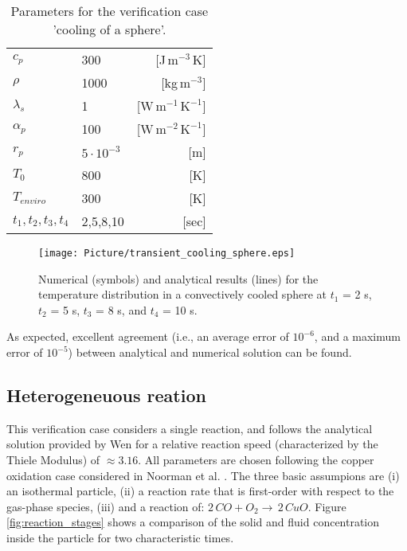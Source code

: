 \documentclass{particles2015}
\begin{document}
\begin{table}[h]
  \centering 
  \caption{Parameters for the verification case 'cooling of a sphere'.}
   \begin{tabular}{llr}
      \hline 
        $c_p$                   &300       & [J$\,\text{m}^{-3}\,$K]\\   
       	$\rho$					&1000	   & [kg$\, \text{m}^{-3}$]\\
        $\lambda_s$				&1		   & [W$\, \text{m}^{-1} \,\text{K}^{-1}$]\\
        $\alpha_p$ 				&100	   & [W$\, \text{m}^{-2} \,\text{K}^{-1}$]\\
        $r_p$					&$5\cdot 10^{-3}$ & [m]\\
        $ T_0$					& 800& [K] \\
        $T_{enviro}$			& 300& [K]\\
        $t_1,t_2,t_3,t_4$ 		& 2,5,8,10 & [sec]\\
      \hline      
       \end{tabular}
   \setlength{\belowcaptionskip}{12pt}
   \label{tab:properties_cooling_sphere}
\end{table}


\begin{figure}[h!]
   \centering
   \texttt{[image: Picture/transient\_cooling\_sphere.eps]}
   \caption{Numerical (symbols) and analytical results (lines) for the temperature distribution in a convectively cooled sphere at $t_1$ = 2 s, $t_2$ = 5 s, $t_3$ = 8 s, and $t_4$ = 10 s.}
   \label{fig:Cooling_sphere}
\end{figure}

As expected, excellent agreement (i.e., an average error of $10^{-6}$, and a maximum error of $10^{-5}$) between analytical and numerical solution can be found.


\subsection{Heterogeneuous reation}
\label{sec:heterogeneuous_reaction}

This verification case considers a single reaction, and follows the analytical solution provided by Wen \cite{Wen} for a relative reaction speed (characterized by the Thiele Modulus) of $\approx 3.16$. All parameters are chosen following the copper oxidation case considered in Noorman et al. \cite{Noorman2011}. The three basic assumpions are (i) an isothermal particle, (ii) a reaction rate that is first-order with respect to the gas-phase species, (iii) and a reaction of: $2 \, CO + O_2 \rightarrow \, 2\, CuO$. Figure \ref{fig:reaction_stages} shows a comparison of the solid and fluid concentration inside the particle for two characteristic times.
\end{document}
